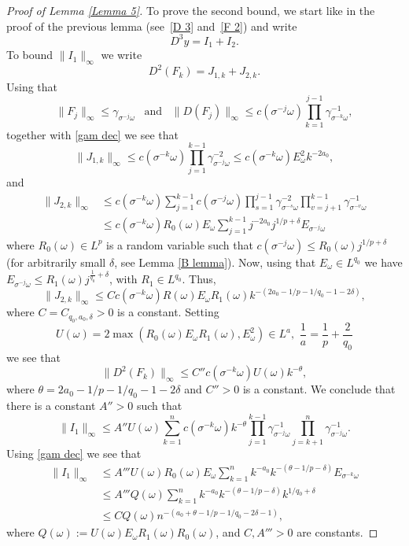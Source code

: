 \documentclass[11pt,reqno,a4paper]{article}
\theoremstyle{special}
\def\om{\omega}
\begin{document}
\begin{proof}[Proof of Lemma \ref{Lemma 5}]
To prove the second bound, we start like in the proof of the previous lemma (see~\eqref{D 3} and~\eqref{F 2}) and write 
$$
D^3y=I_1+I_2.
$$
To bound $\|I_1\|_\infty$ we write 
$$
D^2(F_k)=J_{1,k}+J_{2,k}.
$$
Using that 
\begin{equation}\label{Using}
\|F_j\|_\infty\leq \gamma_{\sigma^{-j}\om}\,\,\,\text{ and }\,\,\,\|D(F_j)\|_\infty\leq c(\sigma^{-j}\om)\prod_{k=1}^{j-1}\gamma_{\sigma^{-k}\om}^{-1},
\end{equation}
together with \eqref{gam dec}
 we see that
$$
 \|J_{1,k}\|_\infty\leq c(\sigma^{-k}\om)\prod_{j=1}^{k-1}\gamma_{\sigma^{-j}\om}^{-2}\leq c(\sigma^{-k}\om)E_\om^2 k^{-2a_0},
 $$ 
and 
\[
\begin{split}
\|J_{2,k}\|_\infty &\leq c(\sigma^{-k}\om)  \sum_{j=1}^{k-1}c(\sigma^{-j}\om) \prod_{s=1}^{j-1}\gamma_{\sigma^{-s}\om}^{-2}\prod_{v=j+1}^{k-1}\gamma_{\sigma^{-v}\om}^{-1} \\
&\leq
c(\sigma^{-k}\om)
R_0(\om) E_\om \sum_{j=1}^{k-1}j^{-2a_0}j^{1/p+\delta}E_{\sigma^{-j}\om}
\end{split}
\]
where $R_0(\om)\in L^p$ is a random variable such that $c(\sigma^{-j}\om)\leq R_0(\om)j^{1/p+\delta}$ (for arbitrarily small $\delta$, see Lemma \ref{B lemma}).
Now, using that $E_\om\in L^{q_0}$ we have $E_{\sigma^{-j}\om}\leq R_1(\om)j^{\frac1{q_0}+\delta}$, with $R_1\in L^{q_0}$. Thus, 
$$ 
\|J_{2,k}\|_\infty\leq Cc(\sigma^{-k}\om)R(\om) E_\om R_1(\om) k^{-(2a_0-1/p-1/q_0-1-2\delta)},
$$
where $C=C_{q_0,a_0,\delta}>0$ is a constant.
Setting
$$
U(\om)=2\max( R_0(\om)E_\om R_1(\om), E_\om^2)\in L^{a},\,\, \frac1{a}=\frac{1}{p}+\frac{2}{q_0}
$$
we see that 
\begin{equation}\label{D 2 F }
\|D^2(F_k)\|_\infty \leq C''c(\sigma^{-k}\om)U(\om)k^{-\theta},
\end{equation}
where $\theta=2a_0-1/p-1/q_0-1-2\delta$ and $C''>0$ is a constant. 
We conclude that  there is a constant $A''>0$ such that
$$
\|I_1\|_\infty\leq A''U(\om)\sum_{k=1}^n c(\sigma^{-k}\om)k^{-\theta}\prod_{j=1}^{k-1}\gamma_{\sigma^{-j}\om}^{-1}\prod_{j=k+1}^{n}\gamma_{\sigma^{-j}\om}^{-1}.
$$
Using \eqref{gam dec}  we see that 
\[
\begin{split}
\|I_1\|_\infty &\leq A'''U(\om)R_0(\om)E_\om\sum_{k=1}^n k^{-a_0}k^{-(\theta-1/p-\delta)}E_{\sigma^{-k}\om} \\
&\leq 
A'''Q(\om)\sum_{k=1}^nk^{-a_0}k^{-(\theta-1/p-\delta)}k^{1/q_0+\delta} \\
&\leq CQ(\om)n^{-(a_0+\theta-1/p-1/q_0-2\delta-1)},
\end{split}
\]
where $Q(\om):=U(\om)E_\om R_1(\om)R_0(\om)$, and $C, A'''>0$ are constants.


\end{proof}
\end{document}
